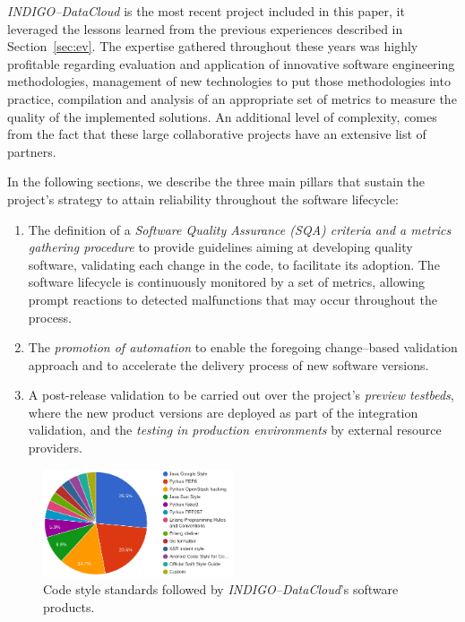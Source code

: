 \documentclass[journal]{IEEEtran}
\begin{document}
{\sl INDIGO--DataCloud} is the most recent project included in this paper, it
leveraged the lessons learned from the previous experiences described in
Section~\ref{sec:ev}. The expertise gathered throughout these years was highly
profitable regarding evaluation and application of innovative software engineering
methodologies, management of new technologies to put those methodologies
into practice, compilation and analysis of an appropriate set of metrics to measure the
quality of the implemented solutions.
An additional level of complexity, comes from the fact that these large collaborative projects
have an extensive list of partners.

In the following sections, we describe the three main pillars that sustain the project's strategy to attain reliability throughout the software lifecycle:

\begin{enumerate}
    \item The definition of a \textit{Software Quality Assurance (SQA) criteria and a metrics gathering procedure} to provide guidelines
    aiming at developing quality software, validating each change in the code, to facilitate its adoption. The software lifecycle is
    continuously monitored by a set of metrics, allowing prompt reactions to detected malfunctions that may occur throughout the process. 
    \item The \textit{promotion of automation} to enable the foregoing change--based validation approach and to accelerate the delivery
    process of new software versions.
    \item A post-release validation to be carried out over the project's \textit{preview testbeds}, where the new product versions
    are deployed as part of the integration validation, and the \textit{testing in production environments} by external resource providers.
\end{enumerate}

\begin{figure}[ht]
\centering
\includegraphics[width=0.5\textwidth]{images/codestyle.png}
\caption{Code style standards followed by {\sl INDIGO--DataCloud}'s software products.}
\label{fig:fig_codestyle}
\end{figure}
\end{document}
